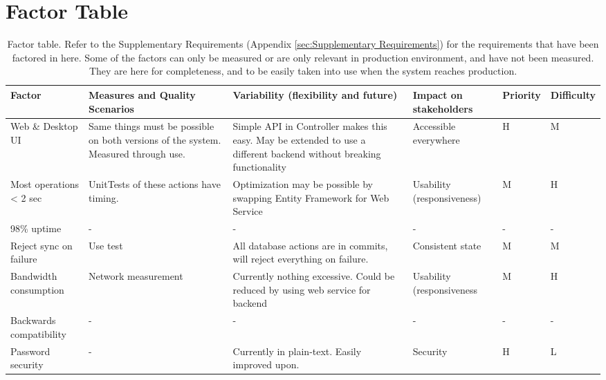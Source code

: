 \section{Factor Table}
\label{sec:factor-table}

\begin{table}[htb]
    \centering
    \begin{tabular}{ | p{65px} | p{90px} | p{110px} | p{50px} | p{20px} | p{20px} | }
        \hline
        {\bf Factor} & {\bf Measures and Quality Scenarios} & {\bf Variability (flexibility and future)} & {\bf Impact on stakeholders} & {\bf Prio\-rity} & {\bf Diffi\-culty}\\
        \hline
        Web \& Desktop UI &
        Same things must be possible on both versions of the system. Measured through use. &
        Simple API in Controller makes this easy. May be extended to use a different backend without breaking functionality &
        Accessible everywhere &
        H &
        M \\
        \hline
        Most operations < 2 sec &
        UnitTests of these actions have timing. &
        Optimization may be possible by swapping Entity Framework for Web Service &
        Usability (respon\-sive\-ness) &
        M &
        H \\
        \hline
        98\% uptime &
        - &
        - &
        - &
        - &
        - \\
        \hline
        Reject sync on failure &
        Use test &
        All database actions are in commits, will reject everything on failure. &
        Consistent state &
        M &
        M \\
        \hline
        Bandwidth consump\-tion &
        Network measurement &
        Currently nothing excessive. Could be reduced by using web service for backend &
        Usability (respon\-sive\-ness &
        M &
        H \\
        \hline
        Backwards compatibility &
        - &
        - &
        - &
        - &
        - \\
        \hline
        Password security &
        - &
        Currently in plain-text. Easily improved upon. &
        Security &
        H &
        L \\
        \hline
    \end{tabular}
    \caption{Factor table. Refer to the Supplementary Requirements (Appendix \ref{sec:Supplementary Requirements}) for the requirements
        that have been factored in here. Some of the factors can only be measured or are only relevant in production environment, and
        have not been measured. They are here for completeness, and to be easily taken into use when the system reaches production.}
    \label{tab:factor-table}
\end{table}